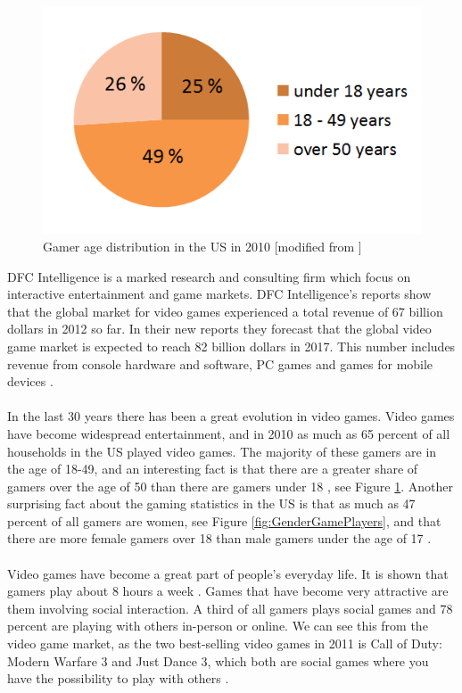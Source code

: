 \begin{figure}
\begin{center}
\includegraphics[scale=0.5]{gamersus}
\caption[Gamer age distribution]{Gamer age distribution in the US in 2010 [modified from \cite{statistics2012}]}
\label{fig:GamersUS}
\end{center}
\end{figure}
DFC Intelligence is a marked research and consulting firm which focus on interactive entertainment and game markets. DFC Intelligence's reports show that the global market for video games experienced a total revenue of 67 billion dollars in 2012 so far. In their new reports they forecast that the global video game market is expected to reach 82 billion dollars in 2017. This number includes revenue from console hardware and software, PC games and games for mobile devices \cite{videogameforcast} \cite{aboutdfcint}.\\ \\
In the last 30 years there has been a great evolution in video games. Video games have become widespread entertainment, and in 2010 as much as 65 percent of all households in the US played video games. The majority of these gamers are in the age of 18-49, and an interesting fact is that there are a greater share of gamers over the age of 50 than there are gamers under 18 \cite{statistics2010} \cite{statistics2012}, see Figure \ref{fig:GamersUS}. Another surprising fact about the gaming statistics in the US is that as much as 47 percent of all gamers are women, see Figure \ref{fig:GenderGamePlayers}, and that there are more female gamers over 18 than male gamers under the age of 17 \cite{statistics2012real}. \\ \\
Video games have become a great part of people's everyday life. It is shown that gamers play about 8 hours a week \cite{statistics2010}. Games that have become very attractive are them involving social interaction. A third of all gamers plays social games and 78 percent are playing with others in-person or online. We can see this from the video game market, as the two best-selling video games in 2011 is Call of Duty: Modern Warfare 3 and Just Dance 3, which both are social games where you have the possibility to play with others \cite{statistics2012real}. \\ \\ 
